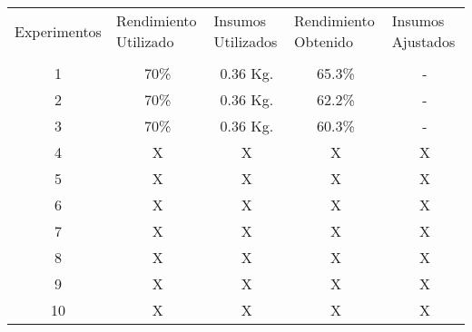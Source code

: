     \begin{minipage}{0.95\textwidth}    
    
        \centering
        \begin{tabularx}{\textwidth}{|X|X|X|X|X|}
             \hline
             \multicolumn{1}{|c|}{Experimentos} & \multirow{1}{2cm}{Rendimiento Utilizado} &\multirow{1}{2cm}{Insumos Utilizados}  & \multirow{1}{2cm}{Rendimiento Obtenido} &\multirow{1}{2cm}{Insumos Ajustados}\\
             & & & &\\
             \hline
             \hline
             \multicolumn{1}{|c|}{1} & \multicolumn{1}{c|}{70\%} & \multicolumn{1}{c|}{0.36 Kg.} &\multicolumn{1}{c|}{65.3\%} &\multicolumn{1}{c|}{-} \\
             \hline
             \multicolumn{1}{|c|}{2} & \multicolumn{1}{c|}{70\%}  & \multicolumn{1}{c|}{0.36 Kg.} &\multicolumn{1}{c|}{62.2\%} &\multicolumn{1}{c|}{-} \\
             \hline
             \multicolumn{1}{|c|}{3} & \multicolumn{1}{c|}{70\%} & \multicolumn{1}{c|}{0.36 Kg.} &\multicolumn{1}{c|}{60.3\%} &\multicolumn{1}{c|}{-} \\
             \hline
             \multicolumn{1}{|c|}{4} & \multicolumn{1}{c|}{X}  & \multicolumn{1}{c|}{X} &\multicolumn{1}{c|}{X} &\multicolumn{1}{c|}{X} \\
             \hline
             \multicolumn{1}{|c|}{5} & \multicolumn{1}{c|}{X}  & \multicolumn{1}{c|}{X} &\multicolumn{1}{c|}{X} &\multicolumn{1}{c|}{X} \\
             \hline
             \multicolumn{1}{|c|}{6} & \multicolumn{1}{c|}{X}  & \multicolumn{1}{c|}{X} &\multicolumn{1}{c|}{X} &\multicolumn{1}{c|}{X} \\
             \hline
             \multicolumn{1}{|c|}{7} & \multicolumn{1}{c|}{X}  & \multicolumn{1}{c|}{X} &\multicolumn{1}{c|}{X} &\multicolumn{1}{c|}{X} \\
             \hline
             \multicolumn{1}{|c|}{8} & \multicolumn{1}{c|}{X}  & \multicolumn{1}{c|}{X} &\multicolumn{1}{c|}{X} &\multicolumn{1}{c|}{X} \\
             \hline
             \multicolumn{1}{|c|}{9} & \multicolumn{1}{c|}{X}  & \multicolumn{1}{c|}{X} &\multicolumn{1}{c|}{X} &\multicolumn{1}{c|}{X} \\
             \hline
             \multicolumn{1}{|c|}{10} & \multicolumn{1}{c|}{X} & \multicolumn{1}{c|}{X} &\multicolumn{1}{c|}{X} &\multicolumn{1}{c|}{X} \\
             \hline
        \end{tabularx}
        \label{tab:ResultadosPilsenEscalonada}
    \end{minipage}
